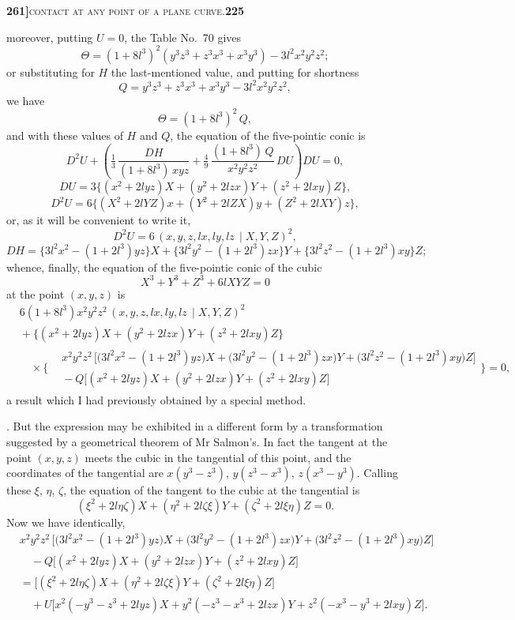 \documentclass[11pt]{article}
\newcommand{\Cdel}{\mid}
\begin{document}
\newpage

\noindent\textbf{261]}\hfill\textsc{contact at any point of a plane curve.}\hfill\textbf{225}

\medskip

\noindent moreover, putting $U = 0$, the Table No.~70 gives
\[
\Theta = (1 + 8l^3)^2(y^3z^3 + z^3x^3 + x^3y^3) - 3l^2x^2y^2z^2;
\]
or substituting for $H$ the last-mentioned value, and putting for shortness
\[
Q = y^3z^3 + z^3x^3 + x^3y^3 - 3l^2 x^2y^2z^2,
\]
we have
\[
\Theta = (1 + 8l^3)^2\,Q,
\]
and with these values of $H$ and $Q$, the equation of the five-pointic conic is
\[
D^2 U + \!\left(\tfrac{1}{3}\,\frac{DH}{(1 + 8l^3)\,xyz} + \tfrac{4}{9}\,\frac{(1 + 8l^3)\,Q}{x^2y^2z^2}\,DU\right)\!DU = 0,
\]
\[
DU = 3\bigl\{(x^2 + 2lyz)X + (y^2 + 2lzx)Y + (z^2 + 2lxy)Z\bigr\},
\]
\[
D^2 U = 6\bigl\{(X^2 + 2lYZ)x + (Y^2 + 2lZX)y + (Z^2 + 2lXY)z\bigr\},
\]
or, as it will be convenient to write it,
\[
D^2 U = 6\,(x, y, z, lx, ly, lz\,\Cdel X, Y, Z)^2,
\]
\[
DH = \bigl\{3l^2 x^2 - (1 + 2l^3)yz\bigr\}X + \bigl\{3l^2 y^2 - (1 + 2l^3)zx\bigr\}Y + \bigl\{3l^2 z^2 - (1 + 2l^3)xy\bigr\}Z;
\]
whence, finally, the equation of the five-pointic conic of the cubic
\[
X^3 + Y^3 + Z^3 + 6lXYZ = 0
\]
at the point $(x, y, z)$ is
\[
\begin{aligned}
&6(1 + 8l^3)x^2y^2z^2\,(x, y, z, lx, ly, lz\,\Cdel X, Y, Z)^2\\
&{}+ \bigl\{(x^2 + 2lyz)X + (y^2 + 2lzx)Y + (z^2 + 2lxy)Z\bigr\}\\
&\quad\times \biggl\{\!\begin{aligned}
& x^2y^2z^2\,\bigl[\bigl(3l^2 x^2 - (1 + 2l^3)yz\bigr)X + \bigl(3l^2 y^2 - (1 + 2l^3)zx\bigr)Y + \bigl(3l^2 z^2 - (1 + 2l^3)xy\bigr)Z\bigr]\\
&{}- Q\bigl[(x^2 + 2lyz)X + (y^2 + 2lzx)Y + (z^2 + 2lxy)Z\bigr]
\end{aligned}\biggr\} = 0,
\end{aligned}
\]
a result which I had previously obtained by a special method.

\medskip

. But the expression may be exhibited in a different form by a transformation suggested by a geometrical theorem of Mr Salmon's. In fact the tangent at the point $(x, y, z)$ meets the cubic in the tangential of this point, and the coordinates of the tangential are $x(y^3 - z^3)$, $y(z^3 - x^3)$, $z(x^3 - y^3)$. Calling these $\xi$, $\eta$, $\zeta$, the equation of the tangent to the cubic at the tangential is
\[
(\xi^2 + 2l\eta\zeta)X + (\eta^2 + 2l\zeta\xi)Y + (\zeta^2 + 2l\xi\eta)Z = 0.
\]
Now we have identically,
\[
\begin{aligned}
&x^2y^2z^2\,\bigl[\bigl(3l^2 x^2 - (1 + 2l^3)yz\bigr)X + \bigl(3l^2 y^2 - (1 + 2l^3)zx\bigr)Y + \bigl(3l^2 z^2 - (1 + 2l^3)xy\bigr)Z\bigr]\\
&\quad{} - Q\bigl[(x^2 + 2lyz)X + (y^2 + 2lzx)Y + (z^2 + 2lxy)Z\bigr]\\
&= \bigl[(\xi^2 + 2l\eta\zeta)X + (\eta^2 + 2l\zeta\xi)Y + (\zeta^2 + 2l\xi\eta)Z\bigr]\\
&\quad{}+ U\bigl[x^2(-y^3 - z^3 + 2lyz)X + y^2(-z^3 - x^3 + 2lzx)Y + z^2(-x^3 - y^3 + 2lxy)Z\bigr].
\end{aligned}
\]
\end{document}
